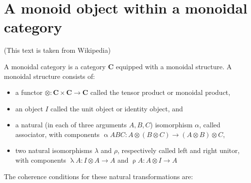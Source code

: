 \documentclass[14pt]{article}
\begin{document}
\section{A monoid object within a monoidal category}

(This text is taken from Wikipedia) 

A monoidal category is a category \(\mathbf{C} \) equipped with a monoidal structure. A monoidal structure consists of:

\begin{itemize}
    \item a functor \(\otimes \colon \mathbf {C} \times \mathbf {C} \to \mathbf {C}\) called the tensor product or monoidal product,
    \item an object \( I \) called the unit object or identity object, and
    \item a natural (in each of three arguments \(A, B, C\)) isomorphism \(\alpha\), called associator, with components
    \( \mathop{\alpha} A B C \colon A\otimes (B\otimes C) \to (A\otimes B)\otimes C\),
    \item two natural isomorphisms \(\lambda\)  and \(\rho\), respectively called left and right unitor, with components \( \mathop{\lambda} A \colon I\otimes A \to A\) and \(\mathop{\rho} A \colon A\otimes I \to A \)
\end{itemize}
The coherence conditions for these natural transformations are:
\end{document}
